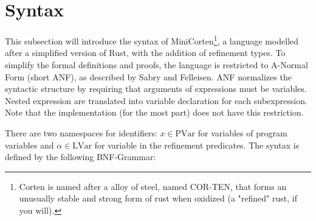 \documentclass[twoside, english]{sdqthesis}
\theoremstyle{definition}
\begin{document}
\section{Syntax}

This subsection will introduce the syntax of MiniCorten\footnote{Corten is named after a alloy of steel, named COR-TEN, that forms an unusually stable and strong form of rust when oxidized (a "refined" rust, if you will).}, a language modelled after a simplified version of Rust, with the addition of refinement types.
To simplify the formal definitions and proofs, the language is restricted to A-Normal Form (short ANF), as described by Sabry and Felleisen.
ANF normalizes the syntactic structure by requiring that arguments of expressions must be variables. Nested expression are translated into variable declaration for each subexpression. Note that the implementation (for the most part) does not have this restriction.

There are two namespaces for identifiers: $x \in \text{PVar}$ for variables of program variables and $\alpha \in \text{LVar}$ for variable in the refinement predicates. The syntax is defined by the following BNF-Grammar:
\end{document}
